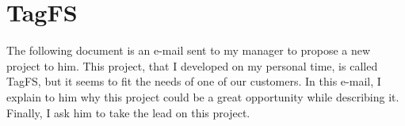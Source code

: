 \chapter{TagFS}


The following document is an e-mail sent to my manager to propose a new project to him. This project, that I developed on my personal time, is called TagFS, but it seems to fit the needs of one of our customers. In this e-mail, I explain to him why this project could be a great opportunity while describing it. Finally, I ask him to take the lead on this project.

\clearpage
\blankpage

